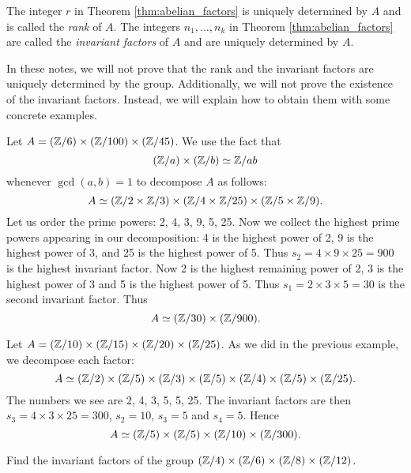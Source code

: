 The integer $r$ 
in Theorem \ref{thm:abelian_factors}
is uniquely determined by $A$ and 
is called the \emph{rank} of $A$. The integers $n_1,\dots,n_k$ 
in Theorem \ref{thm:abelian_factors}
are called the \emph{invariant factors} of $A$ and 
are uniquely determined by $A$. 

In these notes, we will not prove that the rank and the invariant factors are uniquely determined by the group. Additionally, we will not prove the existence 
of the invariant factors. Instead, we will explain how to obtain them with some concrete examples.

\begin{example}
    Let $A=(\mathbb{Z}/6)\times(\mathbb{Z}/100)\times(\mathbb{Z}/45)$. We use 
    the fact that 
    \[
    (\mathbb{Z}/a)\times(\mathbb{Z}/b)\simeq\mathbb{Z}/ab
    \]
    whenever $\gcd(a,b)=1$
    to decompose $A$ as follows:
    \[
    A\simeq (\mathbb{Z}/2\times\mathbb{Z}/3)\times(\mathbb{Z}/4\times\mathbb{Z}/25)\times(\mathbb{Z}/5\times\mathbb{Z}/9).
    \]
    Let us order the prime powers: 2, 4, 3, 9, 5, 25. 
    Now we collect the highest prime powers appearing in our decomposition: 4 is the highest power of 2,
    9 is the highest power of 3, and 25 is the highest power of 5. Thus 
    $s_2=4\times 9\times 25=900$ is the highest invariant factor. Now 
    2 is the highest remaining power of 2, 
    3 is the highest power of 3 and 5 is the highest power of 5. Thus 
    $s_1=2\times 3\times 5=30$ is the second invariant factor. 
    Thus 
    \[ 
    A\simeq (\mathbb{Z}/30)\times(\mathbb{Z}/900).
    \]
\end{example}

\begin{example}
    Let $A=(\mathbb{Z}/10)\times(\mathbb{Z}/15)\times(\mathbb{Z}/20)\times(\mathbb{Z}/25)$. 
    As we did in the previous example, we decompose each factor: 
    \[ 
    A\simeq (\mathbb{Z}/2)\times(\mathbb{Z}/5)\times(\mathbb{Z}/3)\times (\mathbb{Z}/5)\times(\mathbb{Z}/4)\times (\mathbb{Z}/5)\times(\mathbb{Z}/25). 
    \]
    The numbers we see are 2, 4, 3, 5, 5, 25. The invariant factors are
    then $s_3=4\times 3\times 25=300$, $s_2=10$, $s_3=5$ and $s_4=5$. 
    Hence 
    \[ 
    A\simeq (\mathbb{Z}/5)\times(\mathbb{Z}/5)\times(\mathbb{Z}/10)\times(\mathbb{Z}/300).
    \]
\end{example}

\begin{exercise}
\label{xca:factors:24,12,4,2}
    Find the invariant factors 
    of the group $(\mathbb{Z}/4)\times(\mathbb{Z}/6)\times(\mathbb{Z}/8)\times(\mathbb{Z}/12)$. 
\end{exercise}




    


